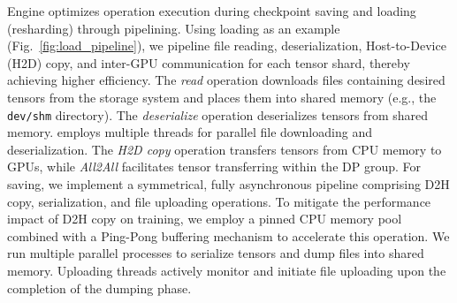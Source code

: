 \sys{} Engine optimizes operation execution during checkpoint saving and loading (resharding) through pipelining. Using loading as an example (Fig.~\ref{fig:load_pipeline}), we pipeline file reading, deserialization, Host-to-Device (H2D) copy, and inter-GPU communication for each tensor shard, thereby achieving higher efficiency.
The \textit{read} operation downloads files containing desired tensors from the storage system and places them into shared memory (e.g., the \texttt{dev/shm} directory). The \textit{deserialize} operation deserializes tensors from shared memory. \sys{} employs multiple threads for parallel file downloading and deserialization. The \textit{H2D copy} operation transfers tensors from CPU memory to GPUs, while \textit{All2All} facilitates tensor transferring within the DP group.
For saving, we implement a symmetrical, fully asynchronous pipeline comprising 
D2H copy, serialization, and file uploading operations. To mitigate the performance impact of D2H copy on training, we employ a pinned CPU memory pool combined with a Ping-Pong buffering mechanism to accelerate this operation. We run multiple parallel processes to serialize tensors and dump files into shared memory.
Uploading threads actively monitor and initiate file uploading upon the completion of the dumping phase.


